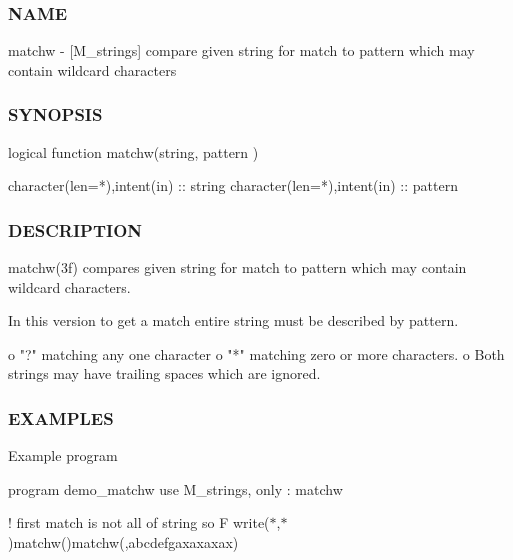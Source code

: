\subsubsection*{N\+A\+ME}

matchw -\/ \mbox{[}M\+\_\+strings\mbox{]} compare given string for match to pattern which may contain wildcard characters 

\subsubsection*{S\+Y\+N\+O\+P\+S\+IS}

\begin{DoxyVerb}logical function matchw(string, pattern )

 character(len=*),intent(in) :: string
 character(len=*),intent(in) :: pattern
\end{DoxyVerb}


\subsubsection*{D\+E\+S\+C\+R\+I\+P\+T\+I\+ON}

\begin{DoxyVerb}matchw(3f) compares given string for match to pattern which may
contain wildcard characters.

In this version to get a match entire string must be described by pattern.

   o  "?" matching any one character
   o  "*" matching zero or more characters.
   o  Both strings may have trailing spaces which are ignored.
\end{DoxyVerb}


\subsubsection*{E\+X\+A\+M\+P\+L\+ES}

Example program

program demo\+\_\+matchw use M\+\_\+strings, only \+: matchw

! first match is not all of string so F write($\ast$,$\ast$)matchw()matchw(\textquotesingle{},\textquotesingle{}abcdefgaxaxaxax\textquotesingle{})

